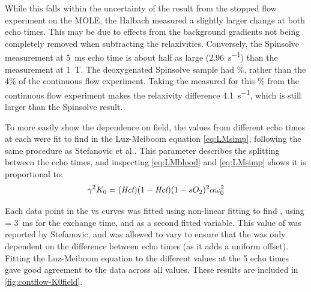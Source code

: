 While this falls within the uncertainty of the result from the stopped flow experiment on the MOLE, the Halbach measured a slightly larger \Rtwo change at both echo times.
This may be due to effects from the background gradients not being completely removed when subtracting the relaxivities.
Conversely, the Spinsolve measurement at \SI{5}{ms} echo time is about half as large (\SI{2.96}{s^{-1}}) than the measurement at \SI{1}{T}.
The deoxygenated Spinsolve sample had \%, rather than the 4\% of the continuous flow experiment.
Taking the measured \Rtwo for this \%  from the continuous flow experiment makes the relaxivity difference \SI{4.1}{s^{-1}}, which is still larger than the Spinsolve result.

To more easily show the dependence on field, the \Ttwo values from different echo times at each \SOtwo were fit to find \Kzero in the Luz-Meiboom equation \autoref{eq:LMsimp}, following the same procedure as Stefanovic et al.\cite{StefanovicHumanwholebloodrelaxometry2004}.
This parameter describes the splitting between the echo times, and inspecting \autoref{eq:LMblood} and \autoref{eq:LMsimp} shows it is proportional to:
\begin{displaymath}
\gamma^2 K_0 = (\textit{Hct})(1-\textit{Hct})(1-sO_2)^2 \alpha \omega_0^2
\end{displaymath}

Each data point in the \Rtwo vs \SOtwo curves was fitted using non-linear fitting to find \Kzero, using  \Texc =  \SI{3}{ms} for the exchange time, and \TtwoO as a second fitted variable.
This value of \Texc was reported by Stefanovic\cite{StefanovicHumanwholebloodrelaxometry2004}, and \TtwoO was allowed to vary to ensure that the \Kzero was only dependent on the difference between echo times (as it adds a uniform offset).
Fitting the Luz-Meiboom equation to the different \Rtwo values at the 5 echo times gave good agreement to the data across all \SOtwo values.
These results are included in \autoref{fig:contflow-K0field}.

